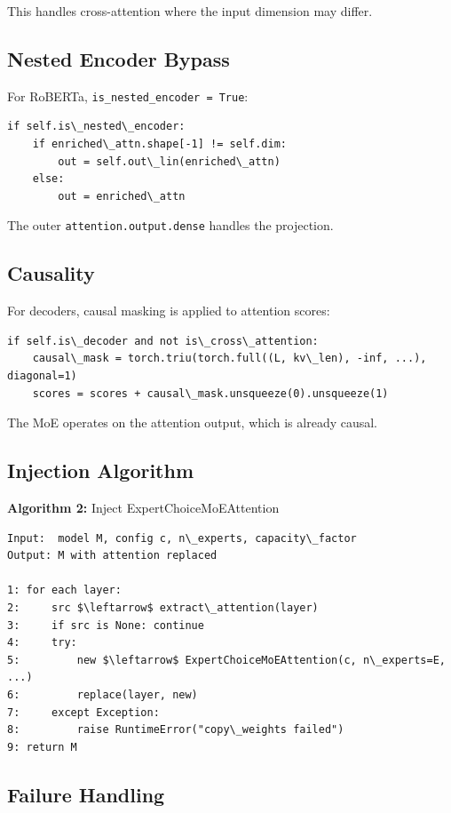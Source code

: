This handles cross-attention where the input dimension may differ.

\subsection{Nested Encoder Bypass}

For RoBERTa, \texttt{is\_nested\_encoder = True}:

\begin{lstlisting}
if self.is\_nested\_encoder:
    if enriched\_attn.shape[-1] != self.dim:
        out = self.out\_lin(enriched\_attn)
    else:
        out = enriched\_attn
\end{lstlisting}

The outer \texttt{attention.output.dense} handles the projection.

\subsection{Causality}

For decoders, causal masking is applied to attention scores:

\begin{lstlisting}
if self.is\_decoder and not is\_cross\_attention:
    causal\_mask = torch.triu(torch.full((L, kv\_len), -inf, ...), diagonal=1)
    scores = scores + causal\_mask.unsqueeze(0).unsqueeze(1)
\end{lstlisting}

The MoE operates on the attention output, which is already causal.

\subsection{Injection Algorithm}

\textbf{Algorithm 2:} Inject ExpertChoiceMoEAttention
\begin{lstlisting}
Input:  model M, config c, n\_experts, capacity\_factor
Output: M with attention replaced

1: for each layer:
2:     src $\leftarrow$ extract\_attention(layer)
3:     if src is None: continue
4:     try:
5:         new $\leftarrow$ ExpertChoiceMoEAttention(c, n\_experts=E, ...)
6:         replace(layer, new)
7:     except Exception:
8:         raise RuntimeError("copy\_weights failed")
9: return M
\end{lstlisting}

\subsection{Failure Handling}

